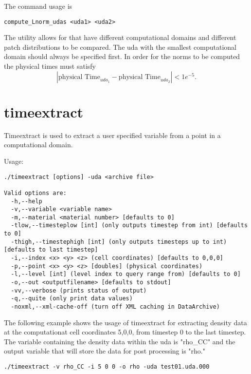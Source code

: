 The command usage is
%
\begin{Verbatim}[fontsize=\footnotesize]
  compute_Lnorm_udas <uda1> <uda2>
\end{Verbatim}
%
The utility allows for  that have different computational
domains and different patch distributions to be compared.  The uda
with the smallest computational domain should always be specified
first.
%
In order for the norms to be computed the physical times must satisfy
\begin{equation*}
| \text{physical Time}_{uda_1} - \text{physical Time}_{uda_2}| < 1e^{-5}.
\end{equation*}

\section{timeextract}

Timeextract is used to extract a user specified variable from a point in a computational
domain.

Usage: \begin{Verbatim}[fontsize=\footnotesize]
./timeextract [options] -uda <archive file>

Valid options are:
  -h,--help
  -v,--variable <variable name>
  -m,--material <material number> [defaults to 0]
  -tlow,--timesteplow [int] (only outputs timestep from int) [defaults to 0]
  -thigh,--timestephigh [int] (only outputs timesteps up to int) [defaults to last timestep]
  -i,--index <x> <y> <z> (cell coordinates) [defaults to 0,0,0]
  -p,--point <x> <y> <z> [doubles] (physical coordinates)
  -l,--level [int] (level index to query range from) [defaults to 0]
  -o,--out <outputfilename> [defaults to stdout]
  -vv,--verbose (prints status of output)
  -q,--quite (only print data values)
  -noxml,--xml-cache-off (turn off XML caching in DataArchive)
 \end{Verbatim}

The following example shows the usage of timeextract for extracting density data
at the computationat cell coordinates 5,0,0, from timestep 0 to the last
timestep. The variable containing the density data within the uda is "rho\_CC" and the output variable that
will store the data for post processing is "rho."
\begin{Verbatim}[fontsize=\footnotesize]
./timeextract -v rho_CC -i 5 0 0 -o rho -uda test01.uda.000
\end{Verbatim}

